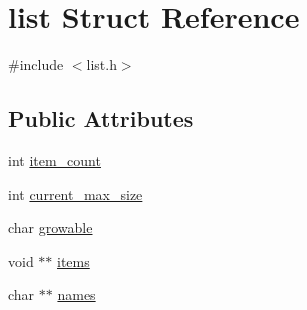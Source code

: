 \hypertarget{structlist}{\section{list Struct Reference}
\label{structlist}
}


{\ttfamily \#include $<$list.\+h$>$}

\subsection*{Public Attributes}
\begin{DoxyCompactItemize}
\item 
int \hyperlink{structlist_a1e4f9682bfdc33db2d825fd41658a88d}{item\+\_\+count}
\item 
int \hyperlink{structlist_af13cdd9f7d31327fc22ed5da5623aa27}{current\+\_\+max\+\_\+size}
\item 
char \hyperlink{structlist_a7da9bddee81290f233d7ec41f26824f3}{growable}
\item 
void $\ast$$\ast$ \hyperlink{structlist_ade0b0790a7fd4f3b65aae379d5a7da85}{items}
\item 
char $\ast$$\ast$ \hyperlink{structlist_a1b3f452b7de983fc5b841f4569285e57}{names}
\end{DoxyCompactItemize}


